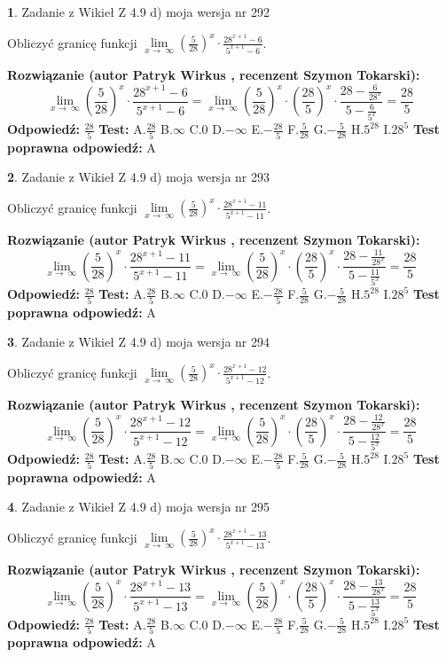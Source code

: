 \documentclass[12pt, a4paper]{article}
\theoremstyle{definition} %
\newtheorem{zad}{}
\newcommand{\zadStart}[1]{\begin{zad}#1\newline}
\newcommand{\zadStop}{\end{zad}}
\newcommand{\rozwStart}[2]{\noindent \textbf{Rozwiązanie (autor #1 , recenzent #2): }\newline}
\newcommand{\rozwStop}{\newline}
\newcommand{\odpStart}{\noindent \textbf{Odpowiedź:}\newline}
\newcommand{\odpStop}{\newline}
\newcommand{\testStart}{\noindent \textbf{Test:}\newline}
\newcommand{\testStop}{\newline}
\newcommand{\kluczStart}{\noindent \textbf{Test poprawna odpowiedź:}\newline}
\newcommand{\kluczStop}{\newline}
\begin{document}
\zadStart{Zadanie z Wikieł Z 4.9 d) moja wersja nr 292}


Obliczyć granicę funkcji  $\lim\limits_{x\to\ \infty}(\frac{5}{28})^{x}\cdot\frac{28^{x+1}-6}{5^{x+1}-6}$.
\zadStop
\rozwStart{Patryk Wirkus}{Szymon Tokarski}
$$\lim\limits_{x\to\ \infty}(\frac{5}{28})^{x}\cdot\frac{28^{x+1}-6}{5^{x+1}-6}=\lim\limits_{x\to\ \infty}(\frac{5}{28})^{x}\cdot(\frac{28}{5})^{x} \cdot \frac{28-\frac{6}{28^{x}}}{5-\frac{6}{5^{x}}} = \frac{28}{5}$$
\rozwStop
\odpStart
$\frac{28}{5}$
\odpStop
\testStart
A.$\frac{28}{5}$ B.$\infty$ C.$0$ D.$-\infty$ E.$-\frac{28}{5}$
F.$\frac{5}{28}$ G.$-\frac{5}{28}$
H.$5^{28}$
I.$28^{5}$
\testStop
\kluczStart
A
\kluczStop



\zadStart{Zadanie z Wikieł Z 4.9 d) moja wersja nr 293}


Obliczyć granicę funkcji  $\lim\limits_{x\to\ \infty}(\frac{5}{28})^{x}\cdot\frac{28^{x+1}-11}{5^{x+1}-11}$.
\zadStop
\rozwStart{Patryk Wirkus}{Szymon Tokarski}
$$\lim\limits_{x\to\ \infty}(\frac{5}{28})^{x}\cdot\frac{28^{x+1}-11}{5^{x+1}-11}=\lim\limits_{x\to\ \infty}(\frac{5}{28})^{x}\cdot(\frac{28}{5})^{x} \cdot \frac{28-\frac{11}{28^{x}}}{5-\frac{11}{5^{x}}} = \frac{28}{5}$$
\rozwStop
\odpStart
$\frac{28}{5}$
\odpStop
\testStart
A.$\frac{28}{5}$ B.$\infty$ C.$0$ D.$-\infty$ E.$-\frac{28}{5}$
F.$\frac{5}{28}$ G.$-\frac{5}{28}$
H.$5^{28}$
I.$28^{5}$
\testStop
\kluczStart
A
\kluczStop



\zadStart{Zadanie z Wikieł Z 4.9 d) moja wersja nr 294}


Obliczyć granicę funkcji  $\lim\limits_{x\to\ \infty}(\frac{5}{28})^{x}\cdot\frac{28^{x+1}-12}{5^{x+1}-12}$.
\zadStop
\rozwStart{Patryk Wirkus}{Szymon Tokarski}
$$\lim\limits_{x\to\ \infty}(\frac{5}{28})^{x}\cdot\frac{28^{x+1}-12}{5^{x+1}-12}=\lim\limits_{x\to\ \infty}(\frac{5}{28})^{x}\cdot(\frac{28}{5})^{x} \cdot \frac{28-\frac{12}{28^{x}}}{5-\frac{12}{5^{x}}} = \frac{28}{5}$$
\rozwStop
\odpStart
$\frac{28}{5}$
\odpStop
\testStart
A.$\frac{28}{5}$ B.$\infty$ C.$0$ D.$-\infty$ E.$-\frac{28}{5}$
F.$\frac{5}{28}$ G.$-\frac{5}{28}$
H.$5^{28}$
I.$28^{5}$
\testStop
\kluczStart
A
\kluczStop



\zadStart{Zadanie z Wikieł Z 4.9 d) moja wersja nr 295}


Obliczyć granicę funkcji  $\lim\limits_{x\to\ \infty}(\frac{5}{28})^{x}\cdot\frac{28^{x+1}-13}{5^{x+1}-13}$.
\zadStop
\rozwStart{Patryk Wirkus}{Szymon Tokarski}
$$\lim\limits_{x\to\ \infty}(\frac{5}{28})^{x}\cdot\frac{28^{x+1}-13}{5^{x+1}-13}=\lim\limits_{x\to\ \infty}(\frac{5}{28})^{x}\cdot(\frac{28}{5})^{x} \cdot \frac{28-\frac{13}{28^{x}}}{5-\frac{13}{5^{x}}} = \frac{28}{5}$$
\rozwStop
\odpStart
$\frac{28}{5}$
\odpStop
\testStart
A.$\frac{28}{5}$ B.$\infty$ C.$0$ D.$-\infty$ E.$-\frac{28}{5}$
F.$\frac{5}{28}$ G.$-\frac{5}{28}$
H.$5^{28}$
I.$28^{5}$
\testStop
\kluczStart
A
\kluczStop
\end{document}
